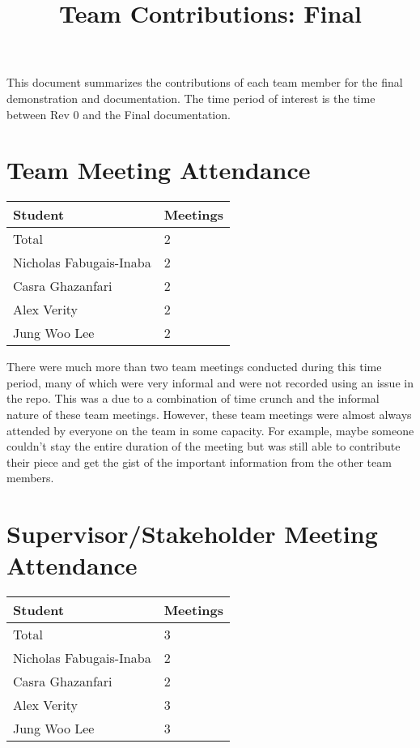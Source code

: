 \documentclass{article}
\title{Team Contributions: Final\\\progname}
\author{\authname}
\date{}
\begin{document}
\maketitle

This document summarizes the contributions of each team member for the final
demonstration and documentation.  The time period of interest is the time
between Rev 0 and the Final documentation.

\section{Team Meeting Attendance}

\begin{table}[H]
\centering
\begin{tabular}{ll}
\toprule
\textbf{Student} & \textbf{Meetings}\\
\midrule
Total & 2\\
Nicholas Fabugais-Inaba & 2\\
Casra Ghazanfari & 2\\
Alex Verity & 2\\
Jung Woo Lee & 2\\
\bottomrule
\end{tabular}
\end{table}

There were much more than two team meetings conducted during this time period, many of 
which were very informal and were not recorded using an issue in the repo. This was 
a due to a combination of time crunch and the informal nature of these team meetings.
However, these team meetings were almost always attended by everyone on the team in
some capacity. For example, maybe someone couldn't stay the entire duration of the 
meeting but was still able to contribute their piece and get the gist of the important
information from the other team members.

\section{Supervisor/Stakeholder Meeting Attendance}

\begin{table}[H]
\centering
\begin{tabular}{ll}
\toprule
\textbf{Student} & \textbf{Meetings}\\
\midrule
Total & 3\\
Nicholas Fabugais-Inaba & 2\\
Casra Ghazanfari & 2\\
Alex Verity & 3\\
Jung Woo Lee & 3\\
\bottomrule
\end{tabular}
\end{table}
\end{document}
